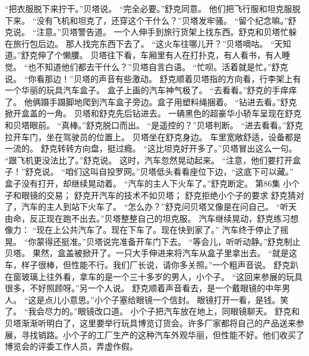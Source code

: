 \documentclass[a4paper,12pt,UTF8,twoside]{ctexbook}
\begin{document}
        “把衣服脱下来拧干。”贝塔说。 
        “完全必要。”舒克同意。 
        他们把飞行服和坦克服脱下来。 
        “没有飞机和坦克了，还穿这个干什么？”贝塔发牢骚。 
        “留个纪念嘛。”舒克说。 
        “注意。”贝塔警告道。 
        一个人伸手到旅行货架上找东西。舒克和贝塔忙躲在旅行包后边。 
        那人找完东西下去了。 
        “这火车往哪儿开？”贝塔嘀咕。 
        “天知道。”舒克伸了个懒腰。 
        贝塔往下看，车厢里有人在打扑克，有人看书，有人睡觉。 
        “也不知道他们都去干什么？”贝塔自言白语。 
        “忙呗。活着就是忙。”舒克说。 
        “你看那边！”贝塔的声音有些激动。 
        舒克顺着贝塔指的方向看，行李架上有一个华丽的玩具汽车盒子。 
        盒子上画的汽车神气极了。 
        “去看看。”舒克的手痒痒了。 
        他俩蹑手蹑脚地爬到汽车盒子旁边。盒子用塑料绳捆着。 
        “钻进去看。”舒克掀开盒盖的一角。 
        贝塔和舒克先后钻进去。 
        一辆黑色的超豪华小轿车呈现在舒克和贝塔眼前。 
        “真棒。”舒克脱口而出。 
        “是遥控的？”贝塔判断。 
        “进去看看。”舒克拉开车门，坐在驾驶员的位置上。 
        贝塔坐在舒克身边。 
        车里宽敞舒适，设备都是一流的。 
        舒克转转方向盘，挺过瘾。 
        “这比坦克好开多了。”贝塔冒出这么一句。 
        “跟飞机更没法比了。”舒克说。 
        这时，汽车忽然晃动起来。 
       “注意，他们要打开盒子！”舒克说。 
        “咱们这叫自投罗网。”贝塔低头看看座位下边，“这底下可以藏。” 
      盒子没有打开，却继续晃动着。 
      “汽车的主人下火车了。”舒克断定。   第86集 
        小个子和眼镜的交易； 
        舒克开汽车的技术不如贝塔； 
        舒克拒绝小个子的要求   
        舒克猜对了，汽车的主人到站下火车了。 
        “怎么办？”舒克问贝塔又像是在问自己。 
        “听天由命，反正现在跑不出去。”贝塔整整自己的坦克服。 
        汽车继续晃动，舒克练习想像力： 
        “现在上公共汽车了。现在下车了。现在快到家了。” 
        汽车终于停止了摇晃。 
        “你蒙得还挺准。”贝塔说完准备开车门下去。 
        “等会儿，听听动静。”舒克制止贝塔。 
        果然，盒盖被掀开了。一只大手伸进来将汽车从盒子里拿出去。 
        “就是这车，样子很棒，但性能不行。我们厂长说，请你多关照。”一个粗声音说。 
        舒克趴在窗玻璃上往外看，拿车的是一个三十多岁的男人，小个子。 
        “这回来参展的玩具很多，不好照顾呀。”另一个人说。 
        舒克顺着声音看去，是一个戴眼镜的中年男人。 
        “这是点儿小意思。”小个子塞给眼镜一个信封。 
        眼镜打开一看，是钱。笑了。 
        “我会尽力的。”眼镜改口道。 
        小个子把汽车放在地上，同眼镜聊天。 
        舒克和贝塔渐渐听明白了，这里要举行玩具博览订货会。许多厂家都将自己的产品送来参展，寻找销路。小个子的工厂生产的这种汽车外观华丽，但性能不好。他们收买了博览会的评委工作人员，弄虚作假。 
\end{document}
